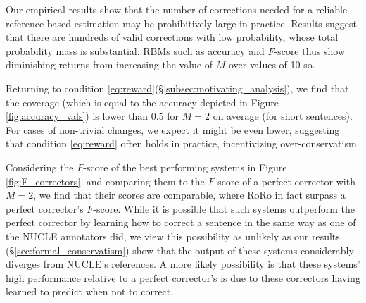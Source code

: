 \documentclass[letter,11pt]{article}
\newcommand{\oa}[1]{\footnote{\color{red}OA: #1}}
\begin{document}
Our empirical results show that the number of corrections needed for a reliable reference-based estimation may
be prohibitively large in practice.
Results suggest that there are hundreds of valid corrections with low probability, whose total probability mass
is substantial. RBMs such as accuracy and $F$-score thus show diminishing returns from increasing the value of $M$ over values
of 10 so.
%
%
%

Returning to condition \ref{eq:reward}(\S \ref{subsec:motivating_analysis}), we find that the coverage
(which is equal to the accuracy depicted in Figure \ref{fig:accuracy_vals})
is lower than 0.5 for $M=2$ on average (for short sentences). For cases of non-trivial
changes, we expect it might be even lower, suggesting that condition \ref{eq:reward} often
holds in practice, incentivizing over-conservatism.

Considering the $F$-score of the best performing systems in Figure \ref{fig:F_correctors}, and
comparing them to the $F$-score of a perfect corrector with $M=2$, we find that their scores are comparable,
where RoRo in fact surpass a perfect corrector's $F$-score.
While it is possible that such systems outperform the perfect corrector by learning how to
correct a sentence in the same way as one of the NUCLE annotators did, we view this possibility
as unlikely as our results (\S\ref{sec:formal_conservatism}) show that the output of these systems considerably diverges from NUCLE's references.
A more likely possibility is that these systems' high performance relative to a perfect corrector's
is due to these correctors having learned to predict when not to correct.
\end{document}
